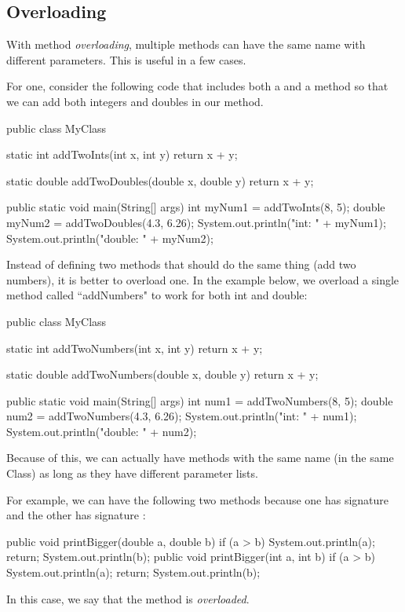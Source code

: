 \subsection{Overloading}

With method \emph{overloading}, multiple methods can have the same name with different parameters. This is useful in a few cases.

For one, consider the following code that includes both a  and a  method so that we can add both integers and doubles in our  method. 

\begin{code}
public class MyClass{
  static int addTwoInts(int x, int y) {
    return x + y;
  }

  static double addTwoDoubles(double x, double y) {
    return x + y;
  }

  public static void main(String[] args) {
    int myNum1 = addTwoInts(8, 5);
    double myNum2 = addTwoDoubles(4.3, 6.26);
    System.out.println("int: " + myNum1);
    System.out.println("double: " + myNum2);
  }
}
\end{code}

Instead of defining two methods that should do the same thing (add two numbers), it is better to overload one. In the example below, we overload a single method called ``addNumbers" to work for both int and double:

\begin{code}
public class MyClass{
  static int addTwoNumbers(int x, int y) {
    return x + y;
  }

  static double addTwoNumbers(double x, double y) {
    return x + y;
  }

  public static void main(String[] args) {
    int num1 = addTwoNumbers(8, 5);
    double num2 = addTwoNumbers(4.3, 6.26);
    System.out.println("int: " + num1);
    System.out.println("double: " + num2);
  }
}
\end{code}



Because of this, we can actually have methods with the same name (in the same
Class) as long as they have different parameter lists.

For example, we can have the following two methods because
one has signature  and the other
has signature :
\begin{code}
public void printBigger(double a, double b) {
  if (a > b) {
    System.out.println(a);
    return;
  }
  System.out.println(b);
}
public void printBigger(int a, int b) {
  if (a > b) {
    System.out.println(a);
    return;
  }
  System.out.println(b);
}
\end{code}
In this case, we say that the  method is \emph{overloaded}.


